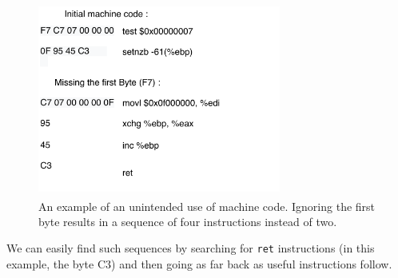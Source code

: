 \documentclass[10pt,twocolumn,a4paper]{article}
\begin{document}
\begin{figure}[h]
  \includegraphics[keepaspectratio,width=8cm]{fig/ByteCode}
  \caption{An example of an unintended use of machine code\textsuperscript{\cite{geometry}}. Ignoring the first byte results in a sequence of four instructions instead of two.}
\end{figure}\newline
We can easily find such sequences by searching for \texttt{ret} instructions (in this example, the byte C3) and then going as far back as useful instructions follow\cite{gadgets}.
\end{document}
